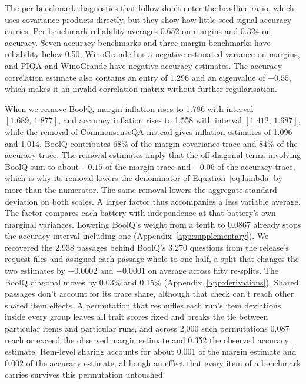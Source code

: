 \documentclass{article}
\newcommand{\ci}[2]{\ensuremath{[#1,\,#2]}}
\begin{document}
The per-benchmark diagnostics that follow don't enter the headline ratio, which uses covariance products directly, but they show how little seed signal accuracy carries. Per-benchmark reliability averages 0.652 on margins and 0.324 on accuracy. Seven accuracy benchmarks and three margin benchmarks have reliability below 0.50, WinoGrande has a negative estimated variance on margins, and PIQA and WinoGrande have negative accuracy estimates. The accuracy correlation estimate also contains an entry of 1.296 and an eigenvalue of $-0.55$, which makes it an invalid correlation matrix without further regularisation.

When we remove BoolQ, margin inflation rises to 1.786 with interval \ci{1.689}{1.877}, and accuracy inflation rises to 1.558 with interval \ci{1.412}{1.687}, while the removal of CommonsenseQA instead gives inflation estimates of 1.096 and 1.014. BoolQ contributes 68\% of the margin covariance trace and 84\% of the accuracy trace. The removal estimates imply that the off-diagonal terms involving BoolQ sum to about $-0.15$ of the margin trace and $-0.06$ of the accuracy trace, which is why its removal lowers the denominator of Equation~\ref{eq:lambda} by more than the numerator. The same removal lowers the aggregate standard deviation on both scales. A larger factor thus accompanies a less variable average. The factor compares each battery with independence at that battery's own marginal variances. Lowering BoolQ's weight from a tenth to 0.0867 already stops the accuracy interval including one (Appendix~\ref{app:supplementary}). We recovered the 2,938 passages behind BoolQ's 3,270 questions from the release's request files and assigned each passage whole to one half, a split that changes the two estimates by $-0.0002$ and $-0.0001$ on average across fifty re-splits. The BoolQ diagonal moves by 0.03\% and 0.15\% (Appendix~\ref{app:derivations}). Shared passages don't account for its trace share, although that check can't reach other shared item effects. A permutation that reshuffles each run's item deviations inside every group leaves all trait scores fixed and breaks the tie between particular items and particular runs, and across 2,000 such permutations 0.087 reach or exceed the observed margin estimate and 0.352 the observed accuracy estimate. Item-level sharing accounts for about 0.001 of the margin estimate and 0.002 of the accuracy estimate, although an effect that every item of a benchmark carries survives this permutation untouched.
\end{document}
